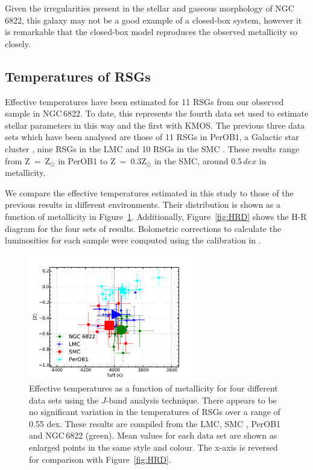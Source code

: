 Given the irregularities present in the stellar and gaseous morphology of NGC\,6822, this galaxy may not be a good example of a closed-box system, however it is remarkable that the closed-box model reproduces the observed metallicity so closely.


\subsection{Temperatures of RSGs} %
\label{sub:temperatures_of_rsgs}

Effective temperatures have been estimated for 11 RSGs from our observed sample in NGC\,6822.
To date, this represents the fourth data set used to estimate stellar parameters in this way and the first with KMOS.
The previous three data sets which have been analysed are those of 11 RSGs in PerOB1,
a Galactic star cluster
\citep{2014ApJ...788...58G}, nine RSGs in the LMC and 10 RSGs in the SMC
\citep[both from][]{2015ApJ...806...21D}.
These results range from Z~=~Z$_{\odot}$ in PerOB1 to Z~=~0.3Z$_{\odot}$ in the SMC, around 0.5\,$dex$ in metallicity.

We compare the effective temperatures estimated in this study to those of the previous results in different environments.
Their distribution is shown as a function of metallicity in Figure~\ref{fig:TvsZ}.
Additionally, Figure~\ref{fig:HRD} shows the H-R diagram for the four sets of results.
Bolometric corrections to calculate the luminosities for each sample were computed using the calibration in
\cite{2013ApJ...767....3D}.


\begin{figure}
 \centering
\includegraphics[width=0.65\textwidth]{ngc6822/N6822_TeffvsZ-thesis}
\caption[Effective temperature as a function of metallicity in different environments]{
Effective temperatures as a function of metallicity for four different data sets using the $J$-band analysis technique.
There appears to be no significant variation in the temperatures of RSGs over a range of 0.55 dex.
These results are compiled from the LMC, SMC
\protect\citep[blue and red points respectively;][]{2015ApJ...806...21D}, PerOB1
\protect\citep[a Galactic RSG cluster; cyan;][]{2014ApJ...788...58G} and NGC\,6822 (green).
Mean values for each data set are shown as enlarged points in the same style and colour.
The x-axis is reversed for comparison with Figure~\ref{fig:HRD}.\label{fig:TvsZ}
         }
\end{figure}

